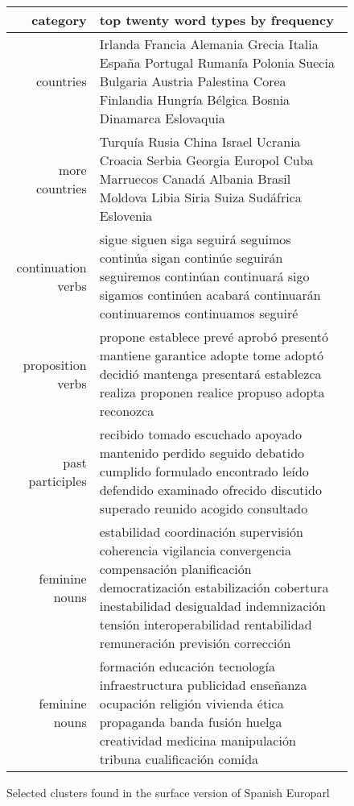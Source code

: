 \begin{figure*}[t!]
  \begin{tabular}{|r|p{10cm}|}
    \hline
    category  & top twenty word types by frequency \\
    \hline
    countries & Irlanda Francia Alemania Grecia Italia España Portugal Rumanía
    Polonia Suecia Bulgaria Austria Palestina Corea Finlandia Hungría Bélgica
    Bosnia Dinamarca Eslovaquia \\
    \hline
    more countries & Turquía Rusia China Israel Ucrania Croacia Serbia Georgia
    Europol Cuba Marruecos Canadá Albania Brasil Moldova Libia Siria Suiza
    Sudáfrica Eslovenia \\
    \hline
    continuation verbs & sigue siguen siga seguirá seguimos continúa
    sigan continúe seguirán seguiremos continúan continuará sigo sigamos
    continúen acabará continuarán continuaremos continuamos seguiré \\
    \hline
    proposition verbs & propone establece prevé aprobó presentó mantiene
    garantice adopte tome adoptó decidió mantenga presentará establezca realiza
    proponen realice propuso adopta reconozca \\
    \hline
    past participles & recibido tomado escuchado apoyado mantenido perdido
    seguido debatido cumplido formulado encontrado leído defendido examinado
    ofrecido discutido superado reunido acogido consultado \\
    \hline
    feminine nouns & estabilidad coordinación supervisión coherencia vigilancia
    convergencia compensación planificación democratización estabilización
    cobertura inestabilidad desigualdad indemnización tensión interoperabilidad
    rentabilidad remuneración previsión corrección \\
    \hline
    feminine nouns & formación educación tecnología infraestructura publicidad
    enseñanza ocupación religión vivienda ética propaganda banda fusión huelga
    creatividad medicina manipulación tribuna cualificación comida \\
    \hline
  \end{tabular}
\caption{Selected clusters found in the surface version of Spanish Europarl}
\label{fig:clusters-europarl-surface}
\end{figure*}


